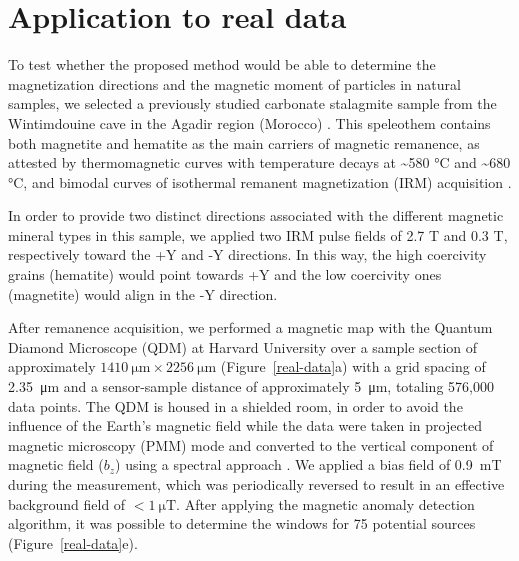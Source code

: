 \section{Application to real data}

To test whether the proposed method would be able to determine the
magnetization directions and the magnetic moment of particles in natural
samples, we selected a previously studied carbonate stalagmite sample from the
Wintimdouine cave in the Agadir region (Morocco) \citep{Ait2019Hydro}. This
speleothem contains both magnetite and hematite as the main carriers of
magnetic remanence, as attested by thermomagnetic curves with temperature
decays at {\textasciitilde}580 °C and {\textasciitilde}680 °C, and bimodal
curves of isothermal remanent magnetization (IRM) acquisition \citep{carmo2019speleothem}.

In order to provide two distinct directions associated with the different
magnetic mineral types in this sample, we applied two IRM pulse fields of 2.7 T
and 0.3 T, respectively toward the +Y and -Y directions. In this way, the high
coercivity grains (hematite) would point towards +Y and the low coercivity ones
(magnetite) would align in the -Y direction.

After remanence acquisition, we performed a magnetic map with the Quantum
Diamond Microscope (QDM) at Harvard University over a sample section of
approximately $\qty{1410}{\um} \times \qty{2256}{\um}$ (Figure~\ref{real-data}a) with a grid
spacing of \qty{2.35}{\um} and a sensor-sample distance of approximately \qty{5}{\um}, totaling
576,000 data points. The QDM is housed in a shielded room, in
order to avoid the influence of the Earth's magnetic field while the data were taken in projected magnetic microscopy (PMM) mode and converted to the vertical component of magnetic field ($b_z$) using a spectral approach \citep{Lima2009, Fu2020,
Glenn2017}. We applied a bias field of \qty{0.9}{\milli\tesla} during the measurement, which was periodically reversed to result in an effective background field of $< \qty{1}{\micro\tesla}$.  After applying the magnetic anomaly detection algorithm, it was
possible to determine the windows for 75 potential sources
(Figure~\ref{real-data}e).

